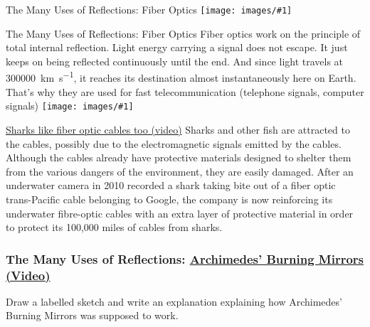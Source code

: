 \documentclass[t]{beamer}
\newcommand{\img}[1]{\texttt{[image: images/\#1]}}
\begin{document}
\begin{frame}{The Many Uses of Reflections: Fiber Optics}
\img{fiber-optic-transmission.jpg}
\end{frame}

\begin{frame}{The Many Uses of Reflections: Fiber Optics}
Fiber optics work on the principle of total internal reflection.  Light energy carrying a signal does not escape.  It just keeps on being reflected continuously until the end. And since light travels at \SI[per-mode = symbol]{300000}{\km\per\s}, it reaches its destination almost instantaneously here on Earth.  That's why they are used for fast telecommunication (telephone signals, computer signals)
\img{optical-fiber-cable.jpg}
\end{frame}

\begin{frame}{\href{http://drpineda.ca/classroom/notes/Science8/LightAndOptics/media/Fiber-optic-shark-bite.html}{Sharks like fiber optic cables too (video)}}
Sharks and other fish are attracted to the cables, possibly due to the electromagnetic signals emitted by the cables. Although the cables already have protective materials designed to shelter them from the various dangers of the environment, they are easily damaged. After an underwater camera in 2010 recorded a shark taking bite out of a fiber optic trans-Pacific cable belonging to Google, the company is now reinforcing its underwater fibre-optic cables with an extra layer of protective material in order to protect its 100,000 miles of cables from sharks.
\end{frame}


\begin{frame}
\frametitle{The Many Uses of Reflections: \href{http://drpineda.ca/classroom/notes/Science8/LightAndOptics/media/Archimedes-burning-mirrors.html}{Archimedes' Burning Mirrors (Video)}}
Draw a labelled sketch and write an explanation explaining how Archimedes' Burning Mirrors was supposed to work. 
\end{frame}
\end{document}
